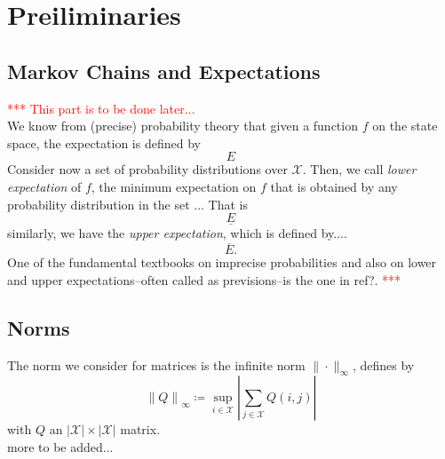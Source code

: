 \documentclass{article}
\title{}
\date{}
\author{
}
\newcommand{\statessymbol}{\mathcal{X}}
\newcommand{\stateset}{\statessymbol}
\newcommand{\lexp}{\underline{E}}
\newcommand{\uexp}{\overline{E}}
\newcommand{\norm}[1]{\left\lVert #1 \right\rVert}
\begin{document}
\maketitle
\section{Preiliminaries}

\subsection{Markov Chains and Expectations}
\textcolor{red}{*** This part is to be done later...}\\
We know from (precise) probability theory that given a function $f$ on the state space, the expectation is defined by 
\begin{equation*}
E
\end{equation*} 
Consider now a set of probability distributions over $\stateset$. 
Then, we call \emph{lower expectation} of $f$, the minimum expectation on $f$ that is obtained by any probability distribution in the set ...
That is 
\begin{equation*}
\lexp
\end{equation*} 
similarly, we have the \emph{upper expectation}, which is defined by....
\begin{equation*}
\uexp.
\end{equation*}  
One of the fundamental textbooks on imprecise probabilities and also on lower and upper expectations--often called as previsions--is the one in ref?.
\textcolor{red}{***}\\

\subsection{Norms}

The norm we consider for matrices is the infinite norm $\|\cdot\|_{\infty}$, defines by
\begin{equation*}
\norm{Q}_{\infty}\coloneqq \sup_{i\in\stateset}|\sum_{j\in\stateset}{Q(i,j)}|
\end{equation*}
with $Q$ an $|\stateset|\times|\stateset|$ matrix.\\

more to be added...

\end{document}
